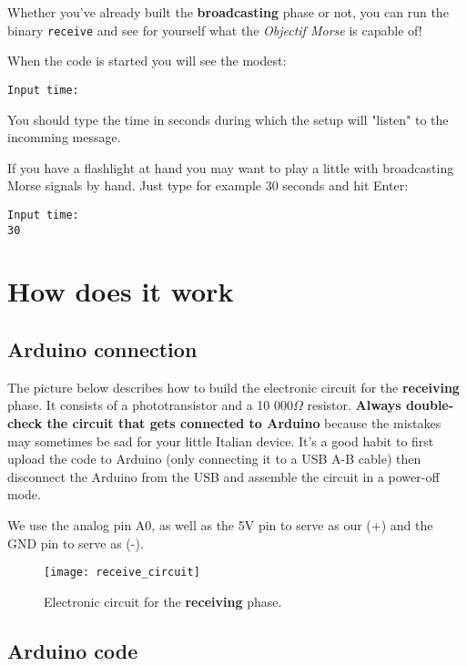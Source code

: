 \documentclass[12pt]{report}
\begin{document}
Whether you've already built the \textbf{broadcasting} phase or not, you can run the binary \verb|receive| and see for yourself what the \textit{Objectif Morse} is capable of!

When the code is started you will see the modest:

\begin{snugshade}
\verb|Input time:|
\end{snugshade}

You should type the time in seconds during which the setup will "listen" to the incomming message.

If you have a flashlight at hand you may want to play a little with broadcasting Morse signals by hand. Just type for example 30 seconds and hit Enter:

\begin{snugshade}
\begin{verbatim}
Input time:
30
\end{verbatim}
\end{snugshade}


\section{How does it work}

\subsection{Arduino connection}

The picture below describes how to build the electronic circuit for the \textbf{receiving} phase. It consists of a phototransistor and a 10 000$\Omega$ resistor. \textbf{Always double-check the circuit that gets connected to Arduino} because the mistakes may sometimes be sad for your little Italian device. It's a good habit to first upload the code to Arduino (only connecting it to a USB A-B cable) then disconnect the Arduino from the USB and assemble the circuit in a power-off mode.

We use the analog pin A0, as well as the 5V pin to serve as our (+) and the GND pin to serve as (-).

\begin{figure}[H]
\centering\texttt{[image: receive\_circuit]}
\caption{Electronic circuit for the \textbf{receiving} phase.}				
\label{fig:receiving_circuit}
\end{figure}




\subsection{Arduino code}
\end{document}
